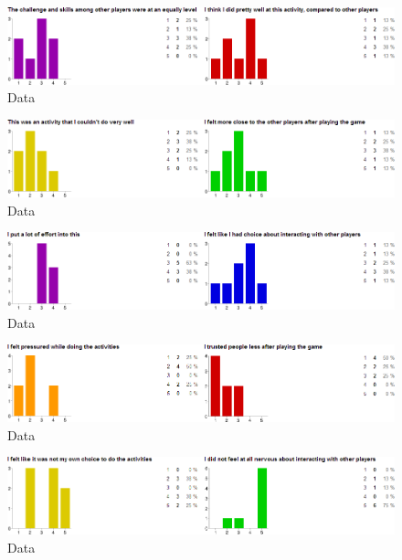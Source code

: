 \begin{figure}[htbp]
\centering
\includegraphics[width=1.0\textwidth]{Pictures/flow_5_senseOfControl}
\caption{Data}
\label{fig:5}
\end{figure}

\begin{figure}[htbp]
\centering
\includegraphics[width=1.0\textwidth]{Pictures/imi_1}
\caption{Data}
\label{fig:6}
\end{figure}

\begin{figure}[htbp]
\centering
\includegraphics[width=1.0\textwidth]{Pictures/imi_2}
\caption{Data}
\label{fig:7}
\end{figure}

\begin{figure}[htbp]
\centering
\includegraphics[width=1.0\textwidth]{Pictures/imi_3}
\caption{Data}
\label{fig:8}
\end{figure}

\begin{figure}[htbp]
\centering
\includegraphics[width=1.0\textwidth]{Pictures/imi_4}
\caption{Data}
\label{fig:9}
\end{figure}